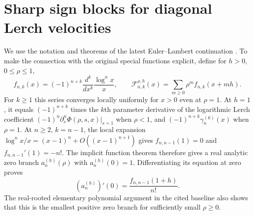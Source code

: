 \documentclass[11pt,a4paper]{article}
\numberwithin{equation}{section}
\theoremstyle{definition}
\theoremstyle{remark}
\begin{document}



\section{Sharp sign blocks for diagonal Lerch velocities}
\label{newdiag:sec:blocks}

We use the notation and theorems of the latest Euler--Lambert
continuation \cite{RepoLerch}.  To make the connection with the original special
functions explicit, define for $h>0$, $0\leq\rho\leq1$,
\[
 f_{n,k}(x)=(-1)^{n+k}\frac{d^k}{dx^k}
                    \frac{\log^n x}{x},\qquad
 \mathcal F_{n,k}^{\rho,h}(x)
       =\sum_{m\geq0}\rho^m f_{n,k}(x+mh).
\]
For $k\geq1$ this series converges locally uniformly for $x>0$
even at $\rho=1$.  At $h=1$, it equals $(-1)^{n+k}$ times the
$k$th parameter derivative of the logarithmic Lerch coefficient
$(-1)^n\partial_s^n\Phi(\rho,s,x)|_{s=1}$ when $\rho<1$,
and $(-1)^{n+k}\gamma_n^{(k)}(x)$ when $\rho=1$.
At $n\geq2$, $k=n-1$, the local expansion
$\log^n x/x=(x-1)^n+O((x-1)^{n+1})$ gives
$f_{n,n-1}(1)=0$ and $f_{n,n-1}'(1)=-n!$.
The implicit function theorem therefore gives a real analytic zero
branch $a_n^{(h)}(\rho)$ with $a_n^{(h)}(0)=1$.
Differentiating its equation at zero proves
\[
 (a_n^{(h)})'(0)=\frac{f_{n,n-1}(1+h)}{n!}.
\]
The real-rooted elementary polynomial argument in the cited baseline
also shows that this is the smallest positive zero branch for
sufficiently small $\rho\geq0$.
\end{document}
